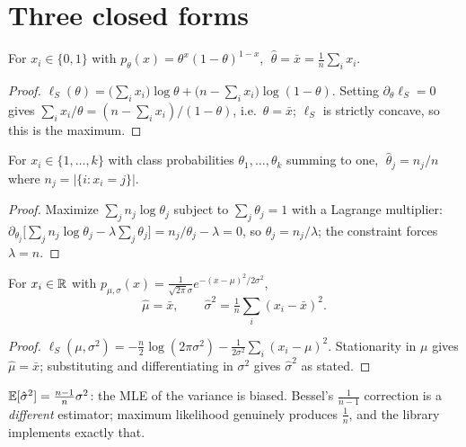 \documentclass[11pt]{article}
\begin{document}
\section{Three closed forms}

\begin{proposition}[Bernoulli]
For $x_i \in \{0,1\}$ with $p_\theta(x) = \theta^x (1-\theta)^{1-x}$,
$\;\hat{\theta} = \bar{x} = \tfrac{1}{n}\sum_i x_i$.
\end{proposition}
\begin{proof}
$\ell_S(\theta) = \big(\sum_i x_i\big) \log\theta + \big(n - \sum_i x_i\big)
\log(1-\theta)$. Setting $\partial_\theta \ell_S = 0$ gives
$\sum_i x_i / \theta = (n - \sum_i x_i)/(1 - \theta)$, i.e.\
$\theta = \bar{x}$; $\ell_S$ is strictly concave, so this is the maximum.
\end{proof}

\begin{proposition}[Multinoulli]
For $x_i \in \{1, \dots, k\}$ with class probabilities
$\theta_1, \dots, \theta_k$ summing to one,
$\;\hat{\theta}_j = n_j / n$ where $n_j = |\{i : x_i = j\}|$.
\end{proposition}
\begin{proof}
Maximize $\sum_j n_j \log \theta_j$ subject to $\sum_j \theta_j = 1$ with a
Lagrange multiplier: $\partial_{\theta_j} \big[ \sum_j n_j \log\theta_j -
\lambda \sum_j \theta_j \big] = n_j/\theta_j - \lambda = 0$, so
$\theta_j = n_j / \lambda$; the constraint forces $\lambda = n$.
\end{proof}

\begin{proposition}[Gaussian]
For $x_i \in \mathbb{R}$ with $p_{\mu,\sigma}(x) =
\tfrac{1}{\sqrt{2\pi}\sigma} e^{-(x-\mu)^2 / 2\sigma^2}$,
\begin{equation*}
  \hat{\mu} = \bar{x},
  \qquad
  \hat{\sigma}^2 = \tfrac{1}{n} \sum_i (x_i - \bar{x})^2 .
\end{equation*}
\end{proposition}
\begin{proof}
$\ell_S(\mu, \sigma^2) = -\tfrac{n}{2}\log(2\pi\sigma^2) -
\tfrac{1}{2\sigma^2}\sum_i (x_i - \mu)^2$. Stationarity in $\mu$ gives
$\hat{\mu} = \bar{x}$; substituting and differentiating in $\sigma^2$ gives
$\hat{\sigma}^2$ as stated.
\end{proof}

\begin{remark}
$\mathbb{E}[\hat{\sigma}^2] = \tfrac{n-1}{n}\sigma^2$: the MLE of the variance is
biased. Bessel's $\tfrac{1}{n-1}$ correction is a \emph{different}
estimator; maximum likelihood genuinely produces $\tfrac{1}{n}$, and the
library implements exactly that.
\end{remark}
\end{document}
